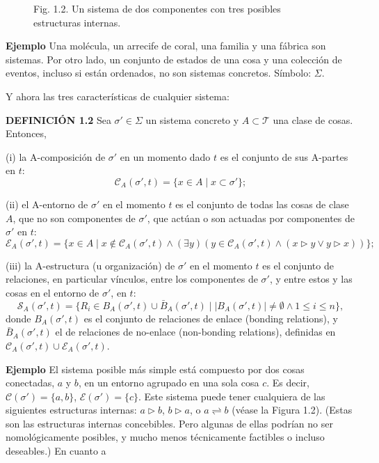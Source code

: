 \newpage
\fancyhf{}
\fancyhead[R]{\thepage} 

\begin{figure}[h!]
    \centering
    \caption*{Fig. 1.2. Un sistema de dos componentes con tres posibles estructuras internas.}
\end{figure}

\vspace{0.5cm} %

{\fontsize{13}{15}\selectfont
\textbf{Ejemplo} Una molécula, un arrecife de coral, una familia y una fábrica son sistemas. Por otro lado, un conjunto de estados de una cosa y una colección de eventos, incluso si están ordenados, no son sistemas concretos. Símbolo: $\Sigma$.

Y ahora las tres características de cualquier sistema:

\textbf{DEFINICIÓN 1.2} Sea $\sigma' \in \Sigma$ un sistema concreto y $A \subset \mathcal{T}$ una clase de cosas. Entonces,

(i) la A-composición de $\sigma'$ en un momento dado $t$ es el conjunto de sus A-partes en $t$:
$$ \mathcal{C}_A(\sigma', t) = \{x \in A \mid x \subset \sigma'\}; $$

(ii) el A-entorno de $\sigma'$ en el momento $t$ es el conjunto de todas las cosas de clase $A$, que no son componentes de $\sigma'$, que actúan o son actuadas por componentes de $\sigma'$ en $t$:
$$ \mathcal{E}_A(\sigma', t) = \{x \in A \mid x \notin \mathcal{C}_A(\sigma', t) \land (\exists y)(y \in \mathcal{C}_A(\sigma', t) \land (x \triangleright y \lor y \triangleright x))\}; $$

(iii) la A-estructura (u organización) de $\sigma'$ en el momento $t$ es el conjunto de relaciones, en particular vínculos, entre los componentes de $\sigma'$, y entre estos y las cosas en el entorno de $\sigma'$, en $t$:
$$ \mathcal{S}_A(\sigma', t) = \{R_i \in B_A(\sigma', t) \cup \bar{B}_A(\sigma', t) \mid |B_A(\sigma', t)| \neq \emptyset \land 1 \le i \le n \}, $$
donde $B_A(\sigma', t)$ es el conjunto de relaciones de enlace (bonding relations), y $\bar{B}_A(\sigma', t)$ el de relaciones de no-enlace (non-bonding relations), definidas en $\mathcal{C}_A(\sigma', t) \cup \mathcal{E}_A(\sigma', t)$.

\textbf{Ejemplo} El sistema posible más simple está compuesto por dos cosas conectadas, $a$ y $b$, en un entorno agrupado en una sola cosa $c$. Es decir, $\mathcal{C}(\sigma') = \{a, b\}$, $\mathcal{E}(\sigma') = \{c\}$. Este sistema puede tener cualquiera de las siguientes estructuras internas: $a \triangleright b$, $b \triangleright a$, o $a \rightleftharpoons b$ (véase la Figura 1.2). (Estas son las estructuras internas concebibles. Pero algunas de ellas podrían no ser nomológicamente posibles, y mucho menos técnicamente factibles o incluso deseables.) En cuanto a
}


